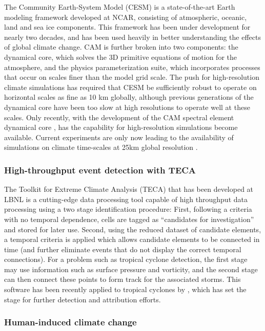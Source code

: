 \documentclass[11pt]{article}
\begin{document}
The Community Earth-System Model (CESM) \cite{RBNetal2010NCAR} is a state-of-the-art Earth modeling framework developed at NCAR, consisting of atmospheric, oceanic, land and sea ice components.  This framework has been under development for nearly two decades, and has been used heavily in better understanding the effects of global climate change.  CAM is further broken into two components: the dynamical core, which solves the 3D primitive equations of motion for the atmosphere, and the physics parameterization suite, which incorporates processes that occur on scales finer than the model grid scale.  The push for high-resolution climate simulations has required that CESM be sufficiently robust to operate on horizontal scales as fine as 10 km globally, although previous generations of the dynamical core have been too slow at high resolutions to operate well at these scales.  Only recently, with the development of the CAM spectral element dynamical core \citep{dennis2012cam}, has the capability for high-resolution simulations become available.  Current experiments are only now leading to the availability of simulations on climate time-scales at 25km global resolution \citep{Bacmeister2014, Wehner2014}.

\subsubsection{High-throughput event detection with TECA} \label{sec:TECA}

The Toolkit for Extreme Climate Analysis (TECA) \citep{PORSBKWFLMWWB2012PCS} that has been developed at LBNL is a cutting-edge data processing tool capable of high throughput data processing using a two stage identification procedure:  First, following a criteria with no temporal dependence, cells are tagged as ``candidates for investigation'' and stored for later use.  Second, using the reduced dataset of candidate elements, a temporal criteria is applied which allows candidate elements to be connected in time (and further eliminate events that do not display the correct temporal connections).  For a problem such as tropical cyclone detection, the first stage may use information such as surface pressure and vorticity, and the second stage can then connect these points to form track for the associated storms.  This software has been recently applied to tropical cyclones by \cite{li2013hurricanes}, which has set the stage for further detection and attribution efforts.

\subsubsection{Human-induced climate change} \label{sec:EnsembleData}
\end{document}
